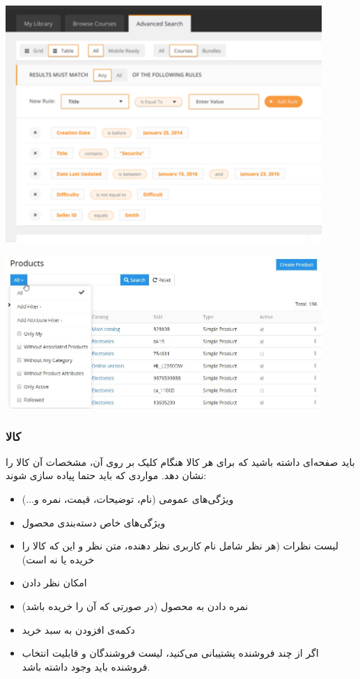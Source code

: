 \documentclass[]{article}
\begin{document}
\begin{center}
\includegraphics[width=0.9\textwidth]{images/image20.png}
\end{center}


\begin{center}
\includegraphics[width=0.9\textwidth]{images/image21.png}
\end{center}

\newpage
\subsubsection*{{\titr کالا}}

باید صفحه‌ای داشته باشید که برای هر کالا هنگام کلیک بر روی آن، مشخصات آن کالا را نشان دهد. مواردی که باید حتما پیاده سازی شوند: 
\begin{itemize}
\item
ویژگی‌های عمومی (نام، توضیحات، قیمت، نمره و...) 

\item
ویژگی‌های خاص دسته‌بندی محصول

\item
 لیست نظرات (هر نظر شامل نام کاربری نظر دهنده، متن نظر و این که کالا را خریده یا نه است)
 
 \item
امکان نظر دادن

\item
نمره دادن به محصول (در صورتی که آن را خریده باشد)

\item 
دکمه‌ی افزودن به سبد خرید

\item
اگر از چند فروشنده پشتیبانی می‌کنید، لیست فروشندگان و قابلیت انتخاب فروشنده باید وجود داشته باشد.

\end{itemize}
\end{document}

